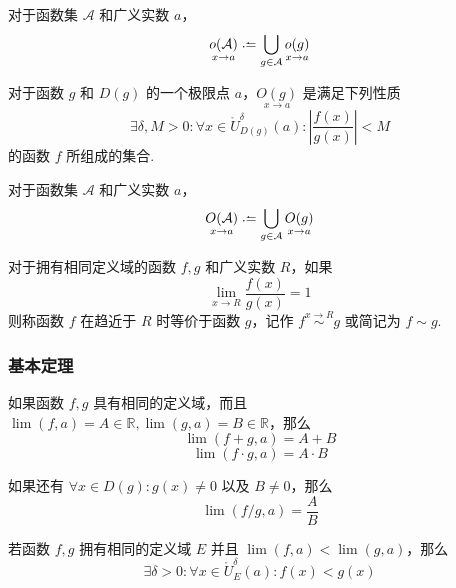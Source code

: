 \begin{subdefinition}
    对于函数集 $\mathcal{A}$ 和广义实数 $a$，
    \[\underset{x \rightarrow a}{o(\mathcal{A})} \defeq \bigcup_{g \in \mathcal{A}}\underset{x \rightarrow a}{o(g)}\]
\end{subdefinition}\vspace{9pt}

\begin{subdefinition}
    对于函数 $g$ 和 $D(g)$ 的一个极限点 $a$，$\underset{x \rightarrow a}{O(g)}$ 是满足下列性质
    \[\exists \delta,M > 0: \forall x \in \mathring{U}_{D(g)}^\delta(a): \left|\frac{f(x)}{g(x)}\right| < M\]
    的函数 $f$ 所组成的集合.
\end{subdefinition}

\begin{subdefinition}
    对于函数集 $\mathcal{A}$ 和广义实数 $a$，
    \[\underset{x \rightarrow a}{O(\mathcal{A})} \defeq \bigcup_{g \in \mathcal{A}} \underset{x \rightarrow a}{O(g)}\]
\end{subdefinition}\vspace{9pt}

\begin{definition}
    对于拥有相同定义域的函数 $f,g$ 和广义实数 $R$，如果
    \[\lim_{x \rightarrow R} \frac{f(x)}{g(x)} = 1\]
    则称函数 $f$ 在趋近于 $R$ 时等价于函数 $g$，记作 $f \overset{x \rightarrow R}{\sim} g$ 或简记为 $f \sim g$.
\end{definition}

\subsubsection{基本定理}
\begin{theorem}
    如果函数 $f,g$ 具有相同的定义域，而且 $\lim(f,a) = A \in \mathbb{R}, \lim(g,a) = B \in \mathbb{R}$，那么
    \[\lim(f+g,a) = A + B\]
    \[\lim(f \cdot g, a) = A \cdot B\]
    
    如果还有 $\forall x \in D(g): g(x) \neq 0$ 以及 $B \neq 0$，那么
    \[\lim(f/g,a) = \frac{A}{B}\]
\end{theorem}\vspace{9pt}

\begin{theorem}
    若函数 $f,g$ 拥有相同的定义域 $E$ 并且 $\lim(f,a) < \lim(g,a)$，那么
    \[\exists \delta > 0: \forall x \in \mathring{U}_E^\delta(a): f(x) < g(x)\]
\end{theorem}\vspace{9pt}

